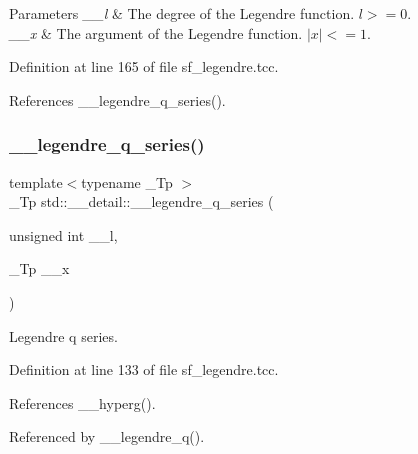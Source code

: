 \begin{DoxyParams}{Parameters}
{\em \+\_\+\+\_\+l} & The degree of the Legendre function. $ l >= 0 $. \\
\hline
{\em \+\_\+\+\_\+x} & The argument of the Legendre function. $ |x| <= 1 $. \\
\hline
\end{DoxyParams}


Definition at line 165 of file sf\+\_\+legendre.\+tcc.



References \+\_\+\+\_\+legendre\+\_\+q\+\_\+series().

\mbox{\label{namespacestd_1_1____detail_a8a1a46e206545e8c7d3cae2a508833aa}} 
\subsubsection{\texorpdfstring{\+\_\+\+\_\+legendre\+\_\+q\+\_\+series()}{\_\_legendre\_q\_series()}}
{\footnotesize\ttfamily template$<$typename \+\_\+\+Tp $>$ \\
\+\_\+\+Tp std\+::\+\_\+\+\_\+detail\+::\+\_\+\+\_\+legendre\+\_\+q\+\_\+series (\begin{DoxyParamCaption}\item[{unsigned int}]{\+\_\+\+\_\+l,  }\item[{\+\_\+\+Tp}]{\+\_\+\+\_\+x }\end{DoxyParamCaption})}

Legendre q series. 

Definition at line 133 of file sf\+\_\+legendre.\+tcc.



References \+\_\+\+\_\+hyperg().



Referenced by \+\_\+\+\_\+legendre\+\_\+q().

\mbox{\label{namespacestd_1_1____detail_a9d53ac0fd39232190e7564fa067a878d}} 

